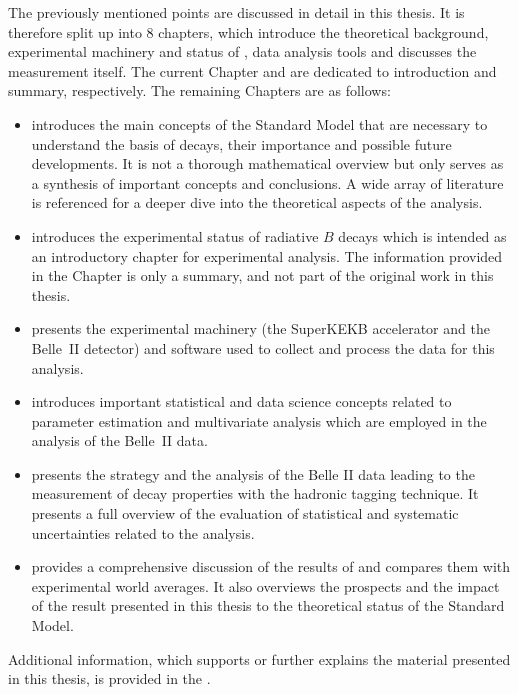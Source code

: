The previously mentioned points are discussed in detail in this thesis.
It is therefore split up into 8 chapters, which introduce the theoretical background, experimental machinery and status of \BtoXsgamma, data analysis tools and discusses the measurement itself.
The current Chapter and  are dedicated to introduction and summary, respectively.
The remaining Chapters are as follows:
\begin{itemize}
    \item {} introduces the main concepts of the Standard Model that are necessary to understand the basis of \BtoXsgamma decays, their importance and possible future developments.
    It is not a thorough mathematical overview but only serves as a synthesis of important concepts and conclusions. 
    A wide array of literature is referenced for a deeper dive into the theoretical aspects of the analysis.
    \item {} introduces the experimental status of radiative $B$ decays which is intended as an introductory chapter for experimental \BtoXsgamma analysis.
    The information provided in the Chapter is only a summary, and not part of the original work in this thesis.
    \item {} presents the experimental machinery (the SuperKEKB accelerator and the Belle~II detector) and software used to collect and process the data for this analysis.
    \item {} introduces important statistical and data science concepts related to parameter estimation and multivariate analysis which are employed in the analysis of the Belle~II data.
    \item {} presents the strategy and the analysis of the Belle II data leading to the measurement of \BtoXsgamma decay properties with the hadronic tagging technique.
    It presents a full overview of the evaluation of statistical and systematic uncertainties related to the analysis.
    \item {} provides a comprehensive discussion of the results of  and compares them with experimental world averages.
    It also overviews the prospects and the impact of the result presented in this thesis to the theoretical status of the Standard Model.
\end{itemize}
Additional information, which supports or further explains the material presented in this thesis, is provided in the .

